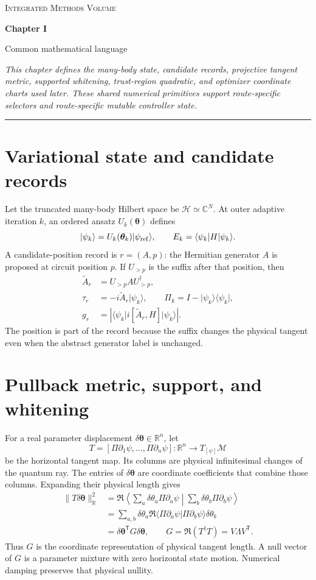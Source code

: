 \documentclass[10pt,twocolumn]{article}
\newcommand{\ket}[1]{\lvert #1\rangle}
\newcommand{\bra}[1]{\langle #1\rvert}
\newcommand{\chapterfront}[3]{%
  \begingroup
  \centering
  {\small\scshape Integrated Methods Volume\par}
  \vspace{0.45em}
  {\Large\bfseries #1\par}
  \vspace{0.25em}
  {\large #2\par}
  \vspace{0.65em}
  \begin{minipage}{0.94\columnwidth}
    \small\itshape #3
  \end{minipage}\par
  \vspace{0.75em}
  \hrule
  \vspace{0.75em}
  \endgroup
}
\begin{document}
\newpage
\chapterfront
{Chapter I}
{Common mathematical language}
{This chapter defines the many-body state, candidate records, projective
tangent metric, supported whitening, trust-region quadratic, and optimizer
coordinate charts used later. These shared numerical primitives support
route-specific selectors and route-specific mutable controller state.}

\section*{Variational state and candidate records}

Let the truncated many-body Hilbert space be
\(\mathcal H\simeq\mathbb C^N\). At outer adaptive iteration \(k\), an ordered ansatz
\(U_k(\bm\theta)\) defines
\begin{equation}
\ket{\psi_k}=U_k(\bm\theta_k)\ket{\psi_{\rm ref}},\qquad
E_k=\bra{\psi_k}H\ket{\psi_k}.
\label{eq:state-energy}
\end{equation}
A candidate-position record is \(r=(A,p)\): the Hermitian generator \(A\)
is proposed at circuit position \(p\). If \(U_{>p}\) is the suffix after
that position, then
\begin{align}
\widetilde A_r&=U_{>p}AU_{>p}^{\dagger},\nonumber\\
\tau_r&=-i\widetilde A_r\ket{\psi_k},\qquad
\Pi_k=I-\ket{\psi_k}\bra{\psi_k},\nonumber\\
g_r&=\left|\bra{\psi_k}i[\widetilde A_r,H]\ket{\psi_k}\right|.
\label{eq:candidate-record}
\end{align}
The position is part of the record because the suffix changes the physical
tangent even when the abstract generator label is unchanged.

\section*{Pullback metric, support, and whitening}

For a real parameter displacement
\(\delta\bm\theta\in\mathbb R^n\), let
\begin{equation}
T=[\Pi\partial_1\psi,\ldots,\Pi\partial_n\psi]
:\mathbb R^n\longrightarrow T_{[\psi]}\mathcal M
\label{eq:tangent-map}
\end{equation}
be the horizontal tangent map. Its columns are physical infinitesimal changes
of the quantum ray. The entries of \(\delta\bm\theta\) are coordinate
coefficients that combine those columns. Expanding their physical length
gives
\begin{align}
\|T\delta\bm\theta\|_{\mathbb R}^2
&=\Re\left\langle
\sum_a\delta\theta_a\Pi\partial_a\psi
\middle|
\sum_b\delta\theta_b\Pi\partial_b\psi
\right\rangle\nonumber\\
&=\sum_{a,b}\delta\theta_a
\Re\langle\Pi\partial_a\psi|\Pi\partial_b\psi\rangle
\delta\theta_b\nonumber\\
&=\delta\bm\theta^{\mathsf T}G\delta\bm\theta,
\qquad
G=\Re(T^\dagger T)=V\Lambda V^{\mathsf T}.
\label{eq:raw-gram}
\end{align}
Thus \(G\) is the coordinate representation of physical tangent length. A
null vector of \(G\) is a parameter mixture with zero horizontal state motion.
Numerical damping preserves that physical nullity.
\end{document}
